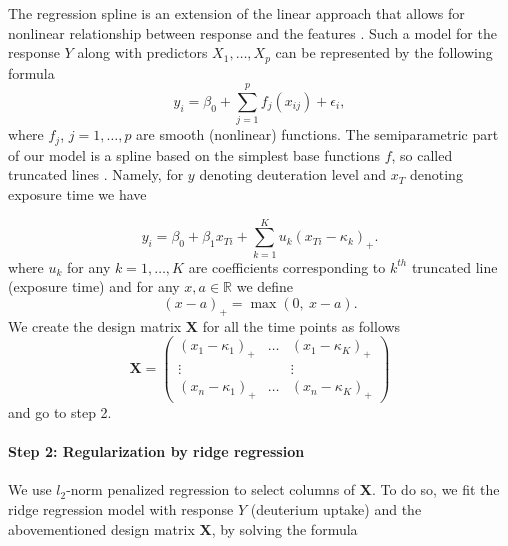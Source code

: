 \documentclass[]{MathAppl18}
\begin{document}
The regression spline is an extension of the linear approach that allows for nonlinear relationship between response and the features \citep[see][Generalized Additive Models]{huang2014introduction}. Such a model for the response $Y$ along with predictors $X_1, \ldots, X_p$ can be represented by the following formula
\begin{equation}
    \label{semi_model1}
    y_i = \beta_0 + \sum_{j = 1}^p f_j(x_{ij}) + \epsilon_i ,
\end{equation}
where $f_j$, $j = 1, \ldots, p$ are smooth (nonlinear) functions. The semiparametric part of our model is a spline based on the simplest base functions $f$, so called truncated lines \citep[see][]{https://doi.org/10.1002/sim.1991}. Namely, for $y$ denoting deuteration level and $x_T$ denoting exposure time we have 

\begin{equation}
\label{spline_fun}
    y_i = \beta_0 + \beta_1 x_{Ti} + \sum_{k = 1}^{K} u_k (x_{Ti} - \kappa_k)_+.
\end{equation}
where $u_k$ for any $k = 1, \ldots, K$ are coefficients corresponding to $k^{th}$ truncated line (exposure time) and for any $x, a \in \mathbb{R}$ we define  $$(x - a)_+ = \max(0, ~x - a).$$
We create the design matrix $\mathbf{X}$ for all the time points as follows
$$
\mathbf{X} = \begin{pmatrix}
(x_1 - \kappa_1)_+ & \hdots & (x_1 - \kappa_K)_+\\
\vdots & &\vdots \\
(x_n - \kappa_1)_+ & \hdots & (x_n - \kappa_K)_+
\end{pmatrix}
$$
and go to step 2.


\paragraph{Step 2: Regularization by ridge regression}

We use $l_2$-norm penalized regression to select columns of $\mathbf{X}$. To do so, we fit the ridge regression model with response $Y$ (deuterium uptake) and the abovementioned design matrix $\mathbf{X}$, by solving the formula  \citep[Shrinkage Methods]{hastie01statisticallearning}
\end{document}
